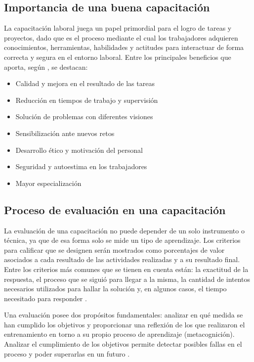 \subsection{Importancia de una buena capacitación}
La capacitación laboral juega un papel primordial para el logro de tareas y proyectos, dado que es el proceso mediante el cual los trabajadores adquieren conocimientos, herramientas, habilidades y actitudes para interactuar de forma correcta y segura en el entorno laboral. Entre los principales beneficios que aporta, según \cite{RogelioE.Martinez2002}, se destacan:

\begin{itemize}
\item Calidad y mejora en el resultado de las tareas
\item Reducción en tiempos de trabajo y supervisión
\item Solución de problemas con diferentes visiones
\item Sensibilización ante nuevos retos
\item Desarrollo ético y motivación del personal
\item Seguridad y autoestima en los trabajadores
\item Mayor especialización
\end{itemize}

\subsection{Proceso de evaluación en una capacitación}
La evaluación de una capacitación no puede depender de un solo instrumento o técnica, ya que de esa forma solo se mide un tipo de aprendizaje. Los criterios para calificar que se designen serán mostrados como porcentajes de valor asociados a cada resultado de las actividades realizadas y a su resultado final. Entre los criterios más comunes que se tienen en cuenta están: la exactitud de la respuesta, el proceso que se siguió para llegar a la misma, la cantidad de intentos necesarios utilizados para hallar la solución y, en algunos casos, el tiempo necesitado para responder \cite{Jacobs2012}.

Una evaluación posee dos propósitos fundamentales: analizar en qué medida se han cumplido los objetivos y proporcionar una reflexión de los que realizaron el entrenamiento en torno a su propio proceso de aprendizaje (metacognición). Analizar el cumplimiento de los objetivos permite detectar posibles fallas en el proceso y poder superarlas en un futuro \cite{Aretio2020}.

